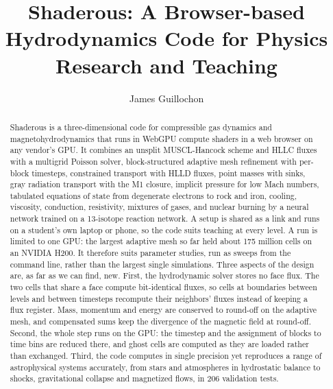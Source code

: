 \documentclass[twocolumn]{aastex701}
\begin{document}
\title{Shaderous: A Browser-based Hydrodynamics Code for Physics Research and Teaching}

\author[0000-0002-9809-8215]{James Guillochon}

\begin{abstract}
Shaderous is a three-dimensional code for compressible gas dynamics and magnetohydrodynamics that runs in WebGPU compute shaders in a web browser on any vendor's GPU. It combines an unsplit MUSCL-Hancock scheme and HLLC fluxes with a multigrid Poisson solver, block-structured adaptive mesh refinement with per-block timesteps, constrained transport with HLLD fluxes, point masses with sinks, gray radiation transport with the M1 closure, implicit pressure for low Mach numbers, tabulated equations of state from degenerate electrons to rock and iron, cooling, viscosity, conduction, resistivity, mixtures of gases, and nuclear burning by a neural network trained on a 13-isotope reaction network. A setup is shared as a link and runs on a student's own laptop or phone, so the code suits teaching at every level. A run is limited to one GPU: the largest adaptive mesh so far held about 175 million cells on an NVIDIA H200. It therefore suits parameter studies, run as sweeps from the command line, rather than the largest single simulations. Three aspects of the design are, as far as we can find, new. First, the hydrodynamic solver stores no face flux. The two cells that share a face compute bit-identical fluxes, so cells at boundaries between levels and between timesteps recompute their neighbors' fluxes instead of keeping a flux register. Mass, momentum and energy are conserved to round-off on the adaptive mesh, and compensated sums keep the divergence of the magnetic field at round-off. Second, the whole step runs on the GPU: the timestep and the assignment of blocks to time bins are reduced there, and ghost cells are computed as they are loaded rather than exchanged. Third, the code computes in single precision yet reproduces a range of astrophysical systems accurately, from stars and atmospheres in hydrostatic balance to shocks, gravitational collapse and magnetized flows, in 206 validation tests.
\end{abstract}

\end{document}
